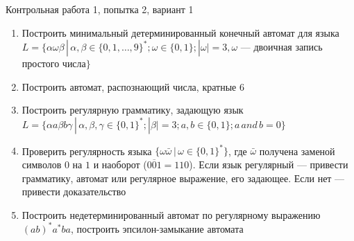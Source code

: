 \documentclass[12pt]{article}
\begin{document}

{\Large Контрольная работа 1, попытка 2, вариант 1}
\bigskip

\begin{enumerate}
  \item Построить минимальный детерминированный конечный автомат для языка \\ $L = \{ \alpha \omega \beta \, | \, \alpha, \beta \in \{ 0, 1, \dots, 9 \}^*; \omega \in \{ 0, 1 \}; |\omega| = 3, \omega$ --- двоичная запись простого числа$\}$
  \item { 
         Построить автомат, распознающий числа, кратные 6}
    \item Построить регулярную грамматику, задающую язык \\ $L = \{ \alpha a \beta b \gamma \, | \, \alpha, \beta, \gamma \in \{ 0, 1 \}^*; |\beta| = 3; a, b \in \{ 0, 1 \}; a \, and \, b = 0 \} $
    \item Проверить регулярность языка $\{ \omega \bar \omega \, | \, \omega \in \{0, 1\}^* \}$, где $\bar \omega$ получена заменой символов $0$ на $1$ и наоборот ($\overline{001} = 110$). Если язык регулярный --- привести грамматику, автомат или регулярное выражение, его задающее. Если нет --- привести доказательство
    \item {Построить недетерминированный автомат по регулярному выражению $ (ab)^*a^*ba  $, построить эпсилон-замыкание автомата}
    
\end{enumerate}
\end{document}
